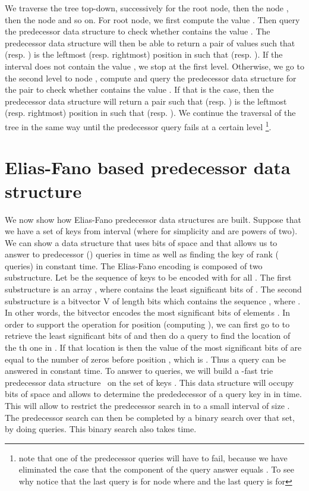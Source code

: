 \documentclass[11pt,runningheads]{llncs}
\begin{document}
{We traverse the tree top-down, successively for the root node, 
then the node , then the node 
and so on. For root node, we first compute the value . 
Then query the predecessor data structure  to check whether 
 contains the value . The predecessor data structure will then be able to return 
a pair of values  such that  (resp. ) 
is the leftmost (resp. rightmost) position in  such that  
(resp. ). If the interval  does not contain the value , 
we stop at the first level. Otherwise, we go to the second level to node , compute  and query the predecessor 
data structure  for the pair 
 to check whether 
contains the value . If that is the case, then
the predecessor data structure will return a pair  such that 
 (resp. ) is the leftmost (resp. rightmost) position 
in  such that  
(resp. ). We continue the traversal 
of the tree in the same way until the predecessor query fails at a certain level 
\footnote{note that one of the predecessor queries will have to fail, because 
we have eliminated the case that the  component of the query answer equals . 
To see why notice that the last query is for node  
where  and the last query 
is for }.


\section{Elias-Fano based predecessor data structure}
\label{sec:Elias_Fano_pred}
We now show how Elias-Fano predecessor data structures are built. 
Suppose that we have a set  of  keys from interval 
(where for simplicity  and  are powers of two). We can 
show a data structure that uses  bits of space 
and that allows us to answer to predecessor () queries
in  time as well as finding the key of rank  ( queries) 
in constant time. The Elias-Fano encoding is composed of 
two substructure. Let  be the sequence 
of keys to be encoded with  for all . The first substructure is an array 
, where  contains the least significant 
 bits of . The second substructure is a bitvector
V of length  bits which contains the sequence , 
where . In other words, the bitvector  encodes the most significant  bits 
of elements . In order to support the  operation for position 
(computing ), we can first go to  to retrieve the least significant 
bits of  and then do a  query to find the location of the th one 
in . If that location is  then the value of the most significant  bits 
of  are equal to the number of zeros before position , which is 
. Thus a  query can be answered in constant time. 
To answer to  queries, we will build a -fast trie 
predecessor data structure~\cite{Wi83} on the set  of  
keys . 
This data structure will occupy  bits of space and allows 
to determine the prededecessor of a query key  in  in  time. 
This will allow to restrict the predecessor search in  to a small interval 
of size . The predecessor search can then be completed by a binary search 
over that set, by doing  queries. This binary search also takes 
 time. 

}
\end{document}
